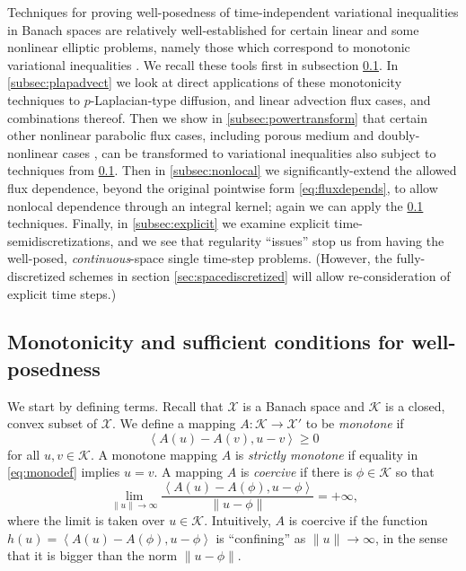 \documentclass[final,leqno,onefignum,onetabnum]{siamltex1213bueler}
\newcommand{\ip}[2]{\ensuremath{\left<#1,#2\right>}}
\begin{document}
Techniques for proving well-posedness of time-independent variational inequalities in Banach spaces are relatively well-established for certain linear and some nonlinear elliptic problems, namely those which correspond to monotonic variational inequalities \cite{KinderlehrerStampacchia}.  We recall these tools first in subsection \ref{subsec:mono}.  In \ref{subsec:plapadvect} we look at direct applications of these monotonicity techniques to $p$-Laplacian-type diffusion, and linear advection flux cases, and combinations thereof.  Then we show in \ref{subsec:powertransform} that certain other nonlinear parabolic flux cases, including porous medium \cite{Vazquez2007} and doubly-nonlinear cases \cite{AlonsoSantillanaDawson,BLKCB}, can be transformed to variational inequalities also subject to techniques from \ref{subsec:mono}.  Then in \ref{subsec:nonlocal} we significantly-extend the allowed flux dependence, beyond the original pointwise form \eqref{eq:fluxdepends}, to allow nonlocal dependence through an integral kernel; again we can apply the \ref{subsec:mono} techniques.  Finally, in \ref{subsec:explicit} we examine explicit time-semidiscretizations, and we see that regularity ``issues'' stop us from having the well-posed, \emph{continuous}-space single time-step problems.  (However, the fully-discretized schemes in section \ref{sec:spacediscretized} will allow re-consideration of explicit time steps.)


\subsection{Monotonicity and sufficient conditions for well-posedness} \label{subsec:mono}  We start by defining terms.  Recall that $\mathcal{X}$ is a Banach space and $\mathcal{K}$ is a closed, convex subset of $\mathcal{X}$.  We define a mapping $A : \mathcal{K} \to \mathcal{X}'$ to be \emph{monotone} \cite{KinderlehrerStampacchia} if
\begin{equation}
   \ip{A(u) - A(v)}{u-v} \ge 0  \label{eq:monodef}
\end{equation}
for all $u,v\in\mathcal{K}$.  A monotone mapping $A$ is \emph{strictly monotone} if equality in \eqref{eq:monodef} implies $u=v$.  A mapping $A$ is \emph{coercive} \cite{KinderlehrerStampacchia} if there is $\phi\in \mathcal{K}$ so that
\begin{equation}
   \lim_{\|u\|\to\infty} \frac{\ip{A(u) - A(\phi)}{u-\phi}}{\|u-\phi\|} = +\infty, \label{eq:coercivedef}
\end{equation}
where the limit is taken over $u\in\mathcal{K}$.  Intuitively, $A$ is coercive if the function $h(u)=\ip{A(u) - A(\phi)}{u-\phi}$ is ``confining'' as $\|u\|\to\infty$, in the sense that it is bigger than the norm $\|u-\phi\|$.
\end{document}
